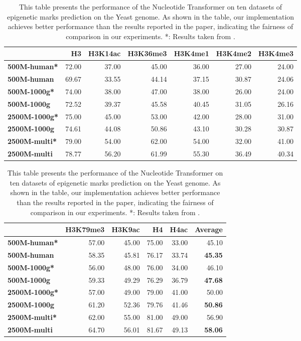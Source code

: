 \documentclass{article}
\begin{document}
\begin{table}[H]
	\centering
	\footnotesize
	\begin{tabular}{lrrrrrr}
		\toprule
		& \textbf{ H3 } & \textbf{ H3K14ac } & \textbf{ H3K36me3 } & \textbf{ H3K4me1 } & \textbf{ H3K4me2 } & \textbf{ H3K4me3 } \\
		\midrule
		\textbf{500M-human*} & 72.00 & 37.00 & 45.00 & 36.00 & 27.00 & 24.00 \\
		\textbf{500M-human}  & 69.67 & 33.55 & 44.14 & 37.15 & 30.87 & 24.06 \\
		\midrule
		\textbf{500M-1000g*} & 74.00 & 38.00 & 47.00 & 38.00 & 26.00 & 24.00 \\
		\textbf{500M-1000g}  & 72.52 & 39.37 & 45.58 & 40.45 & 31.05 & 26.16  \\
\midrule
{\textbf{2500M-1000g*} } &75.00 & 45.00 & 53.00 & 42.00 & 28.00 & 31.00  \\

  {\textbf{2500M-1000g} } & 74.61 & 44.08 & 50.86 & 43.10 & 30.28 & 30.87 \\
  \midrule
  {\textbf{2500M-multi*} } &79.00 & 54.00 & 62.00 & 54.00 & 32.00 & 41.00 \\

            {\textbf{2500M-multi} } & 78.77 & 56.20 & 61.99 & 55.30 & 36.49 & 40.34 \\

		\bottomrule
	\end{tabular}

	\bigskip 

	\begin{tabular}{lrrrrr}
		\toprule
		& \textbf{ H3K79me3 } & \textbf{ H3K9ac } & \textbf{ H4 } & \textbf{ H4ac } & \textbf{Average} \\
		\midrule
		\textbf{500M-human*} & 57.00 & 45.00 & 75.00 & 33.00 & 45.10 \\
		\textbf{500M-human}  & 58.35 & 45.81 & 76.17 & 33.74 & \textbf{45.35} \\
		\midrule
		\textbf{500M-1000g*} & 56.00 & 48.00 & 76.00 & 34.00 & 46.10 \\
		\textbf{500M-1000g}  &59.33 & 49.29 & 76.29 & 36.79 & \textbf{47.68} \\
  \midrule
  {\textbf{2500M-1000g*} } & 57.00 & 49.00 & 79.00 & 41.00 & 50.00  \\

   {\textbf{2500M-1000g} } & 61.20 & 52.36 & 79.76 & 41.46  & \textbf{50.86}\\
   \midrule
   {\textbf{2500M-multi*} } &62.00 & 55.00 & 81.00 & 49.00 & 56.90 \\

            {\textbf{2500M-multi} } & 64.70 & 56.01 & 81.67 & 49.13 & \textbf{58.06} \\
		\bottomrule
	\end{tabular}
	\caption{
		This table presents the performance of the Nucleotide Transformer on ten datasets of epigenetic marks prediction on the Yeast genome. As shown in the table, our implementation achieves better performance than the results reported in the paper, indicating the fairness of comparison in our experiments. *: Results taken from \citet{nt}.
	}\label{tb:nt_preliminary}
\end{table}
\end{document}
